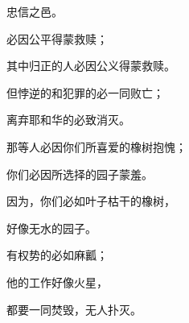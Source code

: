 {\par }{\Q 忠信之邑。
\par }{\BB \par }{\Q {}必因公平得蒙救赎；
\par }{\Q 其中归正的人必因公义得蒙救赎。
\par }{\Q {}但悖逆的和犯罪的必一同败亡；
\par }{\Q 离弃耶和华的必致消灭。
\par }{\Q {}那等人必因你们所喜爱的橡树抱愧；
\par }{\Q 你们必因所选择的园子蒙羞。
\par }{\Q {}因为，你们必如叶子枯干的橡树，
\par }{\Q 好像无水{}的园子。
\par }{\Q {}有权势的必如麻瓤；
\par }{\Q 他的工作好像火星，
\par }{\Q 都要一同焚毁，无人扑灭。

}
